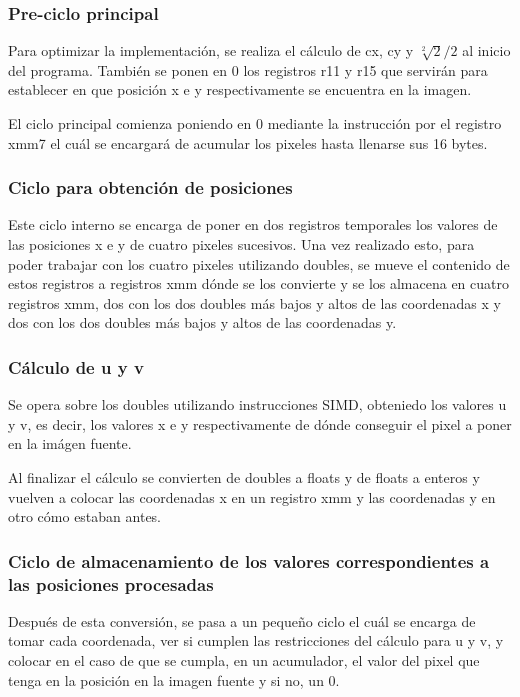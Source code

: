 \subsubsection{Pre-ciclo principal}
Para optimizar la implementación, se realiza el cálculo de cx, cy y $\sqrt[2]{2}/2$ al inicio del programa. También se ponen en 0 los registros r11 y r15 que servirán para establecer en que posición x e y respectivamente se encuentra en la imagen.

El ciclo principal comienza poniendo en 0 mediante la instrucción por el registro xmm7 el cuál se encargará de acumular los pixeles hasta llenarse sus 16 bytes.

\subsubsection{Ciclo para obtención de posiciones}
Este ciclo interno se encarga de poner en dos registros temporales los valores de las posiciones x e y de cuatro pixeles sucesivos. Una vez realizado esto, para poder trabajar con los cuatro pixeles utilizando doubles, se mueve el contenido de estos registros a registros xmm dónde se los convierte y se los almacena en cuatro registros xmm, dos con los dos doubles más bajos y altos de las coordenadas x y dos con los dos doubles más bajos y altos de las coordenadas y.

\subsubsection{Cálculo de u y v}
Se opera sobre los doubles utilizando instrucciones SIMD, obteniedo los valores u y v, es decir, los valores x e y respectivamente de dónde conseguir el pixel a poner en la imágen fuente.

Al finalizar el cálculo se convierten de doubles a floats y de floats a enteros y vuelven a colocar las coordenadas x en un registro xmm y las coordenadas y en otro cómo estaban antes.

\subsubsection{Ciclo de almacenamiento de los valores correspondientes a las posiciones procesadas}
Después de esta conversión, se pasa a un pequeño ciclo el cuál se encarga de tomar cada coordenada, ver si cumplen las restricciones del cálculo para u y v, y colocar en el caso de que se cumpla, en un acumulador, el valor del pixel que tenga en la posición en la imagen fuente y si no, un 0.

